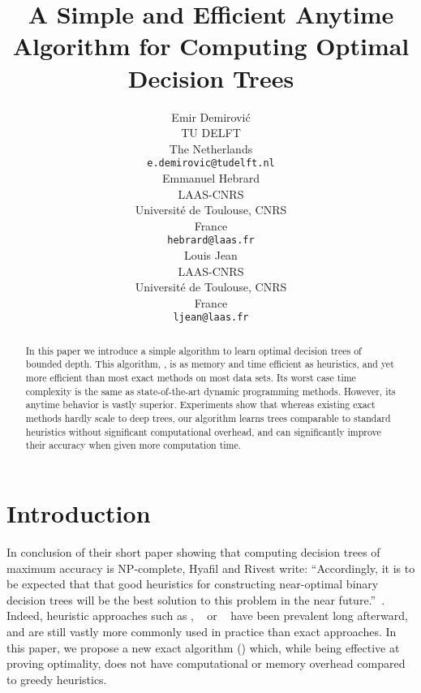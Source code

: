 \documentclass{article}
\title{A Simple and Efficient Anytime Algorithm for Computing Optimal Decision Trees}
\author{%
  Emir Demirovi\'c \\
  TU DELFT \\
	The Netherlands \\
  \texttt{e.demirovic@tudelft.nl} \\
	\And
	Emmanuel Hebrard \\
	LAAS-CNRS \\
	Universit\'e de Toulouse, CNRS \\
	France \\
	\texttt{hebrard@laas.fr} \\
	\And
	Louis Jean \\
	LAAS-CNRS \\
	Universit\'e de Toulouse, CNRS \\
	France \\
	\texttt{ljean@laas.fr} \\
}
\begin{document}
\maketitle






\begin{abstract}
	In this paper we introduce a {simple} algorithm to learn optimal decision trees of bounded depth. This algorithm, \blossom, is as memory and time efficient as heuristics, and yet more efficient than most exact methods on most data sets. 
	Its worst case time complexity is the same as state-of-the-art dynamic programming methods. However, its anytime behavior is vastly superior.
	Experiments show that whereas existing exact methods hardly scale to deep trees, our algorithm learns trees comparable to standard heuristics without significant computational overhead, and can significantly improve their accuracy when given more computation time.
	
\end{abstract}



\section{Introduction}

In conclusion of their short paper showing that computing decision trees of maximum accuracy is NP-complete, Hyafil and Rivest write: ``Accordingly, it is to be expected that that good heuristics for constructing near-optimal binary decision trees will be the best solution to this problem in the near future.''~\cite{NPhardTrees}. Indeed, heuristic approaches such as \cart\cite{breiman1984classification}, \idthree~\cite{10.1023/A:1022643204877} or \cfour~\cite{c4-5} have been prevalent long afterward, and are still vastly more commonly used in practice than exact approaches. In this paper, we propose a new exact algorithm (\blossom) which, while being effective at proving optimality, does not have computational or memory overhead compared to greedy heuristics.
\end{document}
